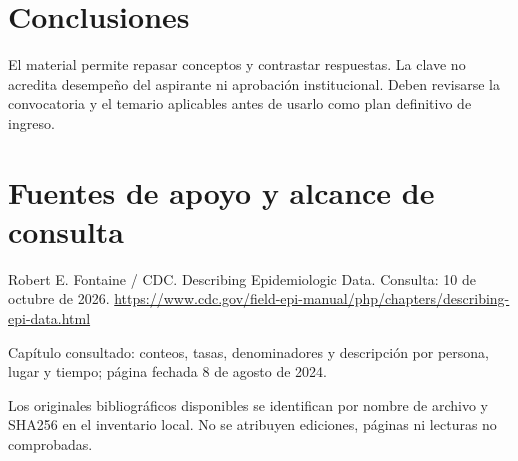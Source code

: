 \section{Conclusiones}
El material permite repasar conceptos y contrastar respuestas. La clave no acredita desempeño del aspirante ni aprobación institucional. Deben revisarse la convocatoria y el temario aplicables antes de usarlo como plan definitivo de ingreso.
\clearpage\section{Fuentes de apoyo y alcance de consulta}
Robert E. Fontaine / CDC. Describing Epidemiologic Data. Consulta: 10 de octubre de 2026. \url{https://www.cdc.gov/field-epi-manual/php/chapters/describing-epi-data.html}\par Capítulo consultado: conteos, tasas, denominadores y descripción por persona, lugar y tiempo; página fechada 8 de agosto de 2024.\par\medskip
Los originales bibliográficos disponibles se identifican por nombre de archivo y SHA256 en el inventario local. No se atribuyen ediciones, páginas ni lecturas no comprobadas.

